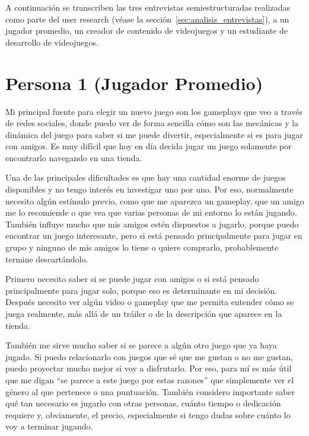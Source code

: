 \label{app:entrevistas}

A continuación se transcriben las tres entrevistas semiestructuradas realizadas como parte del user research (véase la sección~\ref{sec:analisis_entrevistas}), a un jugador promedio, un creador de contenido de videojuegos y un estudiante de desarrollo de videojuegos.

\section*{Persona 1 (Jugador Promedio)}

\begin{description}[leftmargin=0cm, style=nextline]
	\item[\textbf{1. ¿Cómo elegís actualmente qué videojuego jugar y qué dificultades encontrás al tomar esa decisión?}]
	Mi principal fuente para elegir un nuevo juego son los gameplays que veo a través de redes sociales, donde puedo ver de forma sencilla cómo son las mecánicas y la dinámica del juego para saber si me puede divertir, especialmente si es para jugar con amigos. Es muy difícil que hoy en día decida jugar un juego solamente por encontrarlo navegando en una tienda.

	Una de las principales dificultades es que hay una cantidad enorme de juegos disponibles y no tengo interés en investigar uno por uno. Por eso, normalmente necesito algún estímulo previo, como que me aparezca un gameplay, que un amigo me lo recomiende o que vea que varias personas de mi entorno lo están jugando. También influye mucho que mis amigos estén dispuestos a jugarlo, porque puedo encontrar un juego interesante, pero si está pensado principalmente para jugar en grupo y ninguno de mis amigos lo tiene o quiere comprarlo, probablemente termine descartándolo.

	\item[\textbf{2. ¿Qué información necesitás para saber si un videojuego puede gustarte antes de empezarlo o comprarlo?}]
	Primero necesito saber si se puede jugar con amigos o si está pensado principalmente para jugar solo, porque eso es determinante en mi decisión. Después necesito ver algún video o gameplay que me permita entender cómo se juega realmente, más allá de un tráiler o de la descripción que aparece en la tienda.

	También me sirve mucho saber si se parece a algún otro juego que ya haya jugado. Si puedo relacionarlo con juegos que sé que me gustan o no me gustan, puedo proyectar mucho mejor si voy a disfrutarlo. Por eso, para mí es más útil que me digan \enquote{se parece a este juego por estas razones} que simplemente ver el género al que pertenece o una puntuación. También considero importante saber qué tan necesario es jugarlo con otras personas, cuánto tiempo o dedicación requiere y, obviamente, el precio, especialmente si tengo dudas sobre cuánto lo voy a terminar jugando.


\end{description}
